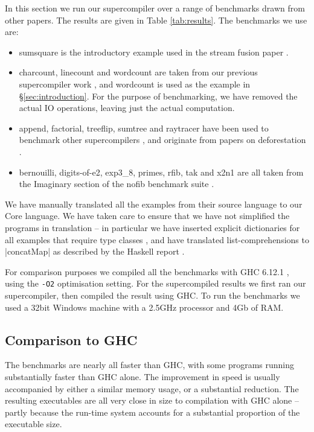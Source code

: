 \documentclass[draft]{sigplanconf}
\begin{document}
In this section we run our supercompiler over a range of benchmarks drawn from other papers. The results are given in Table \ref{tab:results}. The benchmarks we use are:

\begin{itemize}
\item sumsquare is the introductory example used in the stream fusion paper \cite{coutts:stream_fusion}.
\item charcount, linecount and wordcount are taken from our previous supercompiler work \cite{me:supero}, and wordcount is used as the example in \S\ref{sec:introduction}. For the purpose of benchmarking, we have removed the actual IO operations, leaving just the actual computation.
\item append, factorial, treeflip, sumtree and raytracer have been used to benchmark other supercompilers \cite{jonsson:supercompilation}, and originate from papers on deforestation \cite{wadler:deforestation,kort:raytracer}.
\item bernouilli, digits-of-e2, exp3\_8, primes, rfib, tak and x2n1 are all taken from the Imaginary section of the nofib benchmark suite \cite{nofib}.
\end{itemize}

We have manually translated all the examples from their source language to our Core language. We have taken care to ensure that we have not simplified the programs in translation -- in particular we have inserted explicit dictionaries for all examples that require type classes \cite{wadler:type_classes}, and have translated list-comprehensions to |concatMap| as described by the Haskell report \cite{haskell}.

For comparison purposes we compiled all the benchmarks with GHC 6.12.1 \cite{ghc6_12}, using the \texttt{-O2} optimisation setting. For the supercompiled results we first ran our supercompiler, then compiled the result using GHC. To run the benchmarks we used a 32bit Windows machine with a 2.5GHz processor and 4Gb of RAM.

\subsection{Comparison to GHC}

The benchmarks are nearly all faster than GHC, with some programs running substantially faster than GHC alone. The improvement in speed is usually accompanied by either a similar memory usage, or a substantial reduction. The resulting executables are all very close in size to compilation with GHC alone -- partly because the run-time system accounts for a substantial proportion of the executable size.
\end{document}
